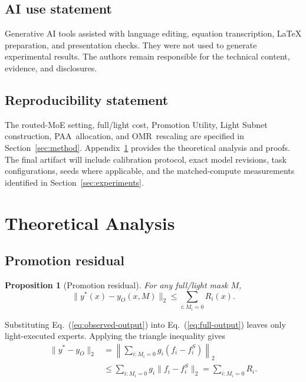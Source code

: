 \documentclass{article}
\newcommand{\PAA}{\textsc{PAA}}
\newcommand{\OMR}{\textsc{OMR}}
\newtheorem{proposition}{Proposition}
\begin{document}
\subsection*{AI use statement}
Generative AI tools assisted with language editing, equation transcription, LaTeX preparation, and presentation checks. They were not used to generate experimental results. The authors remain responsible for the technical content, evidence, and disclosures.

\subsection*{Reproducibility statement}
The routed-MoE setting, full/light cost, Promotion Utility, Light Subnet construction, \PAA\ allocation, and \OMR\ rescaling are specified in Section~\ref{sec:method}. Appendix~\ref{app:theory} provides the theoretical analysis and proofs. The final artifact will include calibration protocol, exact model revisions, task configurations, seeds where applicable, and the matched-compute measurements identified in Section~\ref{sec:experiments}.




\appendix

\section{Theoretical Analysis}
\label{app:theory}

\subsection{Promotion residual}

\begin{proposition}[Promotion residual]
For any full/light mask $M$,
\begin{equation}
  \lVert y^*(x)-y_O(x,M)\rVert_2\leq\sum_{i:M_i=0}R_i(x).
  \label{eq:prop-residual}
\end{equation}
\end{proposition}
Substituting Eq.~(\ref{eq:observed-output}) into Eq.~(\ref{eq:full-output}) leaves only light-executed experts. Applying the triangle inequality gives
\begin{align}
  \lVert y^*-y_O\rVert_2
  &=\left\lVert\sum_{i:M_i=0}g_i(f_i-f_i^S)\right\rVert_2\\
  &\leq\sum_{i:M_i=0}g_i\lVert f_i-f_i^S\rVert_2
  =\sum_{i:M_i=0}R_i.
\end{align}
\end{document}
